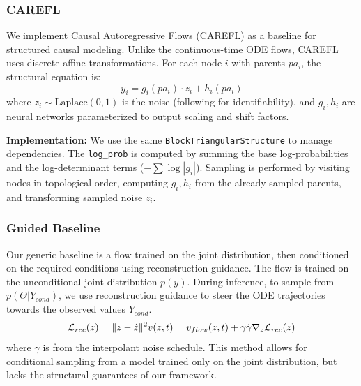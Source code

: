 \subsubsection{CAREFL}
We implement Causal Autoregressive Flows (CAREFL) \citep{khemakhem2021causal} as a baseline for structured causal modeling. Unlike the continuous-time ODE flows, CAREFL uses discrete affine transformations. For each node $i$ with parents $pa_i$, the structural equation is:
\begin{equation}
    y_i = g_i(pa_i) \cdot z_i + h_i(pa_i)
\end{equation}
where $z_i \sim \text{Laplace}(0, 1)$ is the noise (following \citealp{khemakhem2021causal} for identifiability), and $g_i, h_i$ are neural networks parameterized to output scaling and shift factors.

\textbf{Implementation:} We use the same \texttt{BlockTriangularStructure} to manage dependencies. The \texttt{log\_prob} is computed by summing the base log-probabilities and the log-determinant terms ($-\sum \log |g_i|$). Sampling is performed by visiting nodes in topological order, computing $g_i, h_i$ from the already sampled parents, and transforming sampled noise $z_i$.

\subsubsection{Guided Baseline}
Our generic baseline is a flow trained on the joint distribution, then conditioned on the required conditions using reconstruction guidance.
The flow is trained on the unconditional joint distribution $p(y)$. During inference, to sample from $p(\Theta | Y_{cond})$, we use reconstruction guidance to steer the ODE trajectories towards the observed values $Y_{cond}$.
\begin{equation}
\mathcal{L}_{rec}(z) = \| z - \hat{z} \|^2 \\
v(z, t) = v_{flow}(z, t) + \gamma \dot\gamma \nabla_{z} \mathcal{L}_{rec}(z)
\end{equation}
where $\gamma$ is from the interpolant noise schedule. This method allows for conditional sampling from a model trained only on the joint distribution, but lacks the structural guarantees of our framework.
